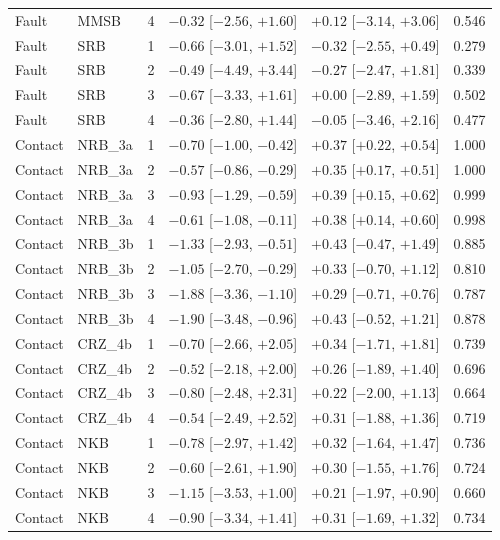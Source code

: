 \begin{tabular}{lllllr}
Fault & MMSB & 4 & $-0.32$ [$-2.56$, $+1.60$] & $+0.12$ [$-3.14$, $+3.06$] & 0.546 \\
Fault & SRB & 1 & $-0.66$ [$-3.01$, $+1.52$] & $-0.32$ [$-2.55$, $+0.49$] & 0.279 \\
Fault & SRB & 2 & $-0.49$ [$-4.49$, $+3.44$] & $-0.27$ [$-2.47$, $+1.81$] & 0.339 \\
Fault & SRB & 3 & $-0.67$ [$-3.33$, $+1.61$] & $+0.00$ [$-2.89$, $+1.59$] & 0.502 \\
Fault & SRB & 4 & $-0.36$ [$-2.80$, $+1.44$] & $-0.05$ [$-3.46$, $+2.16$] & 0.477 \\
\midrule
Contact & NRB\_3a & 1 & $-0.70$ [$-1.00$, $-0.42$] & $+0.37$ [$+0.22$, $+0.54$] & 1.000 \\
Contact & NRB\_3a & 2 & $-0.57$ [$-0.86$, $-0.29$] & $+0.35$ [$+0.17$, $+0.51$] & 1.000 \\
Contact & NRB\_3a & 3 & $-0.93$ [$-1.29$, $-0.59$] & $+0.39$ [$+0.15$, $+0.62$] & 0.999 \\
Contact & NRB\_3a & 4 & $-0.61$ [$-1.08$, $-0.11$] & $+0.38$ [$+0.14$, $+0.60$] & 0.998 \\
Contact & NRB\_3b & 1 & $-1.33$ [$-2.93$, $-0.51$] & $+0.43$ [$-0.47$, $+1.49$] & 0.885 \\
Contact & NRB\_3b & 2 & $-1.05$ [$-2.70$, $-0.29$] & $+0.33$ [$-0.70$, $+1.12$] & 0.810 \\
Contact & NRB\_3b & 3 & $-1.88$ [$-3.36$, $-1.10$] & $+0.29$ [$-0.71$, $+0.76$] & 0.787 \\
Contact & NRB\_3b & 4 & $-1.90$ [$-3.48$, $-0.96$] & $+0.43$ [$-0.52$, $+1.21$] & 0.878 \\
Contact & CRZ\_4b & 1 & $-0.70$ [$-2.66$, $+2.05$] & $+0.34$ [$-1.71$, $+1.81$] & 0.739 \\
Contact & CRZ\_4b & 2 & $-0.52$ [$-2.18$, $+2.00$] & $+0.26$ [$-1.89$, $+1.40$] & 0.696 \\
Contact & CRZ\_4b & 3 & $-0.80$ [$-2.48$, $+2.31$] & $+0.22$ [$-2.00$, $+1.13$] & 0.664 \\
Contact & CRZ\_4b & 4 & $-0.54$ [$-2.49$, $+2.52$] & $+0.31$ [$-1.88$, $+1.36$] & 0.719 \\
Contact & NKB & 1 & $-0.78$ [$-2.97$, $+1.42$] & $+0.32$ [$-1.64$, $+1.47$] & 0.736 \\
Contact & NKB & 2 & $-0.60$ [$-2.61$, $+1.90$] & $+0.30$ [$-1.55$, $+1.76$] & 0.724 \\
Contact & NKB & 3 & $-1.15$ [$-3.53$, $+1.00$] & $+0.21$ [$-1.97$, $+0.90$] & 0.660 \\
Contact & NKB & 4 & $-0.90$ [$-3.34$, $+1.41$] & $+0.31$ [$-1.69$, $+1.32$] & 0.734 \\

\end{tabular}
